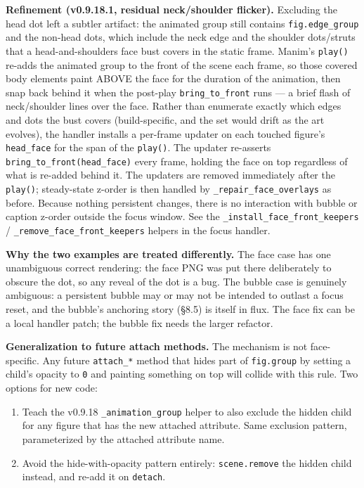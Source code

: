 \documentclass[
  11pt,
]{book}
\providecommand{\tightlist}{%
  \setlength{\itemsep}{0pt}\setlength{\parskip}{0pt}}
\begin{document}
\textbf{Refinement (v0.9.18.1, residual neck/shoulder flicker).}
Excluding the head dot left a subtler artifact: the animated group
still contains \texttt{fig.edge\_group} and the non-head dots, which
include the neck edge and the shoulder dots/struts that a
head-and-shoulders face bust covers in the static frame. Manim's
\texttt{play()} re-adds the animated group to the front of the scene
each frame, so those covered body elements paint ABOVE the face for
the duration of the animation, then snap back behind it when the
post-play \texttt{bring\_to\_front} runs --- a brief flash of
neck/shoulder lines over the face. Rather than enumerate exactly
which edges and dots the bust covers (build-specific, and the set
would drift as the art evolves), the handler installs a per-frame
updater on each touched figure's \texttt{head\_face} for the span of
the \texttt{play()}. The updater re-asserts
\texttt{bring\_to\_front(head\_face)} every frame, holding the face
on top regardless of what is re-added behind it. The updaters are
removed immediately after the \texttt{play()}; steady-state z-order
is then handled by \texttt{\_repair\_face\_overlays} as before.
Because nothing persistent changes, there is no interaction with
bubble or caption z-order outside the focus window. See the
\texttt{\_install\_face\_front\_keepers} /
\texttt{\_remove\_face\_front\_keepers} helpers in the focus handler.

\medskip

\textbf{Why the two examples are treated differently.} The face case
has one unambiguous correct rendering: the face PNG was put there
deliberately to obscure the dot, so any reveal of the dot is a bug.
The bubble case is genuinely ambiguous: a persistent bubble may or
may not be intended to outlast a focus reset, and the bubble's
anchoring story (\S 8.5) is itself in flux. The face fix can be a
local handler patch; the bubble fix needs the larger refactor.

\medskip

\textbf{Generalization to future attach methods.} The mechanism is
not face-specific. Any future \texttt{attach\_*} method that hides
part of \texttt{fig.group} by setting a child's opacity to \texttt{0}
and painting something on top will collide with this rule. Two
options for new code:

\begin{enumerate}
\tightlist
\item
  Teach the v0.9.18 \texttt{\_animation\_group} helper to also
  exclude the hidden child for any figure that has the new attached
  attribute. Same exclusion pattern, parameterized by the attached
  attribute name.
\item
  Avoid the hide-with-opacity pattern entirely: \texttt{scene.remove}
  the hidden child instead, and re-add it on \texttt{detach}.
\end{enumerate}
\end{document}
